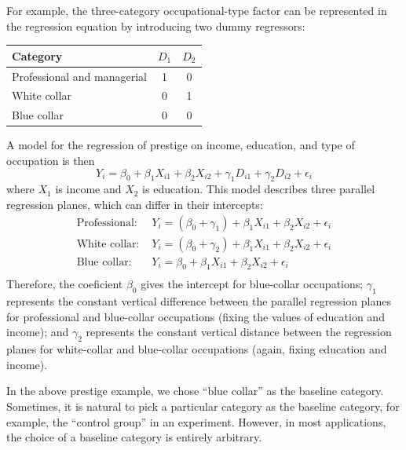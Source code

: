 For example, the three-category occupational-type factor can be represented in the regression equation by introducing two dummy regressors:
\begin{center}
\begin{tabular}{ l c c}
\hline
Category & $D_1$ & $D_2$ \\ 
\hline
Professional and managerial & 1 & 0 \\
White collar & 0 & 1 \\
Blue collar & 0 & 0 \\
\hline
\end{tabular}
\end{center}
%
A model for the regression of prestige on income, education, and type of occupation is then
$$
Y_i = \beta_0 + \beta_1 X_{i1} + \beta_2 X_{i2} + \gamma_1 D_{i1} + \gamma_2 D_{i2} + \epsilon_i
$$
%
where $X_1$ is income and $X_2$ is education.
This model describes three parallel regression planes, which can differ in their intercepts:
$$
\begin{array}{ll}
\mbox{Professional: } & Y_i = (\beta_0 + \gamma_1) + \beta_1 X_{i1} + \beta_2 X_{i2} + \epsilon_i\\
\mbox{White collar: } & Y_i = (\beta_0 + \gamma_2) + \beta_1 X_{i1} + \beta_2 X_{i2} + \epsilon_i \\
\mbox{Blue collar: } & Y_i = \beta_0 + \beta_1 X_{i1} + \beta_2 X_{i2} + \epsilon_i\\
\end{array}
$$
%
Therefore, the coeficient $\beta_0$ gives the intercept for blue-collar occupations; $\gamma_1$ represents the constant vertical difference between the parallel regression planes for professional and blue-collar occupations (fixing the values of education and income); and $\gamma_2$ represents the constant vertical distance between the regression planes for white-collar and blue-collar occupations (again, fixing education and income).

In the above prestige example, we chose ``blue collar'' as the baseline category.
Sometimes, it is natural to pick a particular category as the baseline category, for example, the ``control group'' in an experiment.
However, in most applications, the choice of a baseline category is entirely arbitrary.

